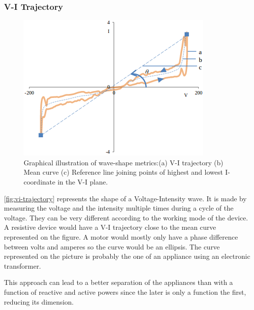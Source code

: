 \subsubsection{V-I Trajectory}\label{section-vi}
\begin{figure}
    \centering
    \includegraphics[width=\linewidth]{img/vi-trajectory.png}
    \caption[Graphical illustration of wave-shape metrics]{Graphical illustration of wave-shape metrics:(a) V-I trajectory  (b) Mean curve    (c)  Reference line joining points of highest and lowest  I-coordinate in the V-I plane. \cite{hassan2014empirical}}
    \label{fig:vi-trajectory}
    \vspace{-30pt}
\end{figure}
\autoref{fig:vi-trajectory} represents the shape of a Voltage-Intensity wave. It is made by measuring the voltage and the intensity multiple times during a cycle of the voltage. \cite{hassan2014empirical} They can be very different according to the working mode of the device. A resistive device would have a V-I trajectory close to the mean curve represented on the figure. A motor would mostly only have a phase difference between volts and amperes so the curve would be an ellipsis. The curve represented on the picture is probably the one of an appliance using an electronic transformer.

This approach can lead to a better separation of the appliances than with a function of reactive and active powers since the later is only a function the first, reducing its dimension.

